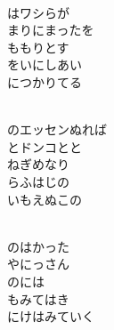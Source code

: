 \documentclass[10pt,b5j]{tarticle} %
\begin{document}
\vspace{1.5em} %
\newcommand{\linespace}{0.5em} %
\newcommand{\blocksize}{0.5\hsize} %
\newcommand{\itemmargin}{3em} %
\begin{enumerate} %
    \setlength{\itemindent}{\itemmargin} %
    \begin{minipage}[c]{\blocksize}
    
        \vspace{\linespace}
        \item~\\
        はワシらが\\
        まりにまったを\\
        ももりとす\\
        をいにしあい\\
        につかりてる
        
    \end{minipage}
    \begin{minipage}[c]{\blocksize}
        
        \vspace{\linespace}
        \item~\\
        のエッセンぬれば\\
        とドンコとと\\
        ねぎめなり\\
        らふはじの\\
        いもえぬこの
        
    \end{minipage}
    \begin{minipage}[c]{\blocksize}
        
        \vspace{\linespace}
        \item~\\
        のはかった\\
        やにっさん\\
        のには\\
        もみてはき\\
        にけはみていく
        

\end{minipage}
\end{enumerate}
\end{document}

